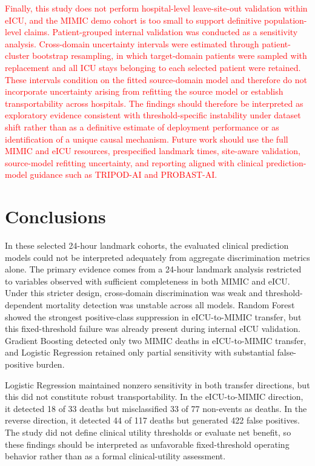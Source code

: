 \documentclass[utf8]{FrontiersinHarvard} %
\begin{document}
\textcolor{red}{Finally, this study does not perform hospital-level leave-site-out validation within eICU, and the MIMIC demo cohort is too small to support definitive population-level claims. Patient-grouped internal validation was conducted as a sensitivity analysis. Cross-domain uncertainty intervals were estimated through patient-cluster bootstrap resampling, in which target-domain patients were sampled with replacement and all ICU stays belonging to each selected patient were retained. These intervals condition on the fitted source-domain model and therefore do not incorporate uncertainty arising from refitting the source model or establish transportability across hospitals. The findings should therefore be interpreted as exploratory evidence consistent with threshold-specific instability under dataset shift rather than as a definitive estimate of deployment performance or as identification of a unique causal mechanism. Future work should use the full MIMIC and eICU resources, prespecified landmark times, site-aware validation, source-model refitting uncertainty, and reporting aligned with clinical prediction-model guidance such as TRIPOD-AI and PROBAST-AI.}

\section{Conclusions}
In these selected 24-hour landmark cohorts, the evaluated clinical prediction models could not be interpreted adequately from aggregate discrimination metrics alone. The primary evidence comes from a 24-hour landmark analysis restricted to variables observed with sufficient completeness in both MIMIC and eICU. Under this stricter design, cross-domain discrimination was weak and threshold-dependent mortality detection was unstable across all models. Random Forest showed the strongest positive-class suppression in eICU-to-MIMIC transfer, but this fixed-threshold failure was already present during internal eICU validation. Gradient Boosting detected only two MIMIC deaths in eICU-to-MIMIC transfer, and Logistic Regression retained only partial sensitivity with substantial false-positive burden.

Logistic Regression maintained nonzero sensitivity in both transfer directions, but this did not constitute robust transportability. In the eICU-to-MIMIC direction, it detected 18 of 33 deaths but misclassified 33 of 77 non-events as deaths. In the reverse direction, it detected 44 of 117 deaths but generated 422 false positives. The study did not define clinical utility thresholds or evaluate net benefit, so these findings should be interpreted as unfavorable fixed-threshold operating behavior rather than as a formal clinical-utility assessment.
\end{document}

